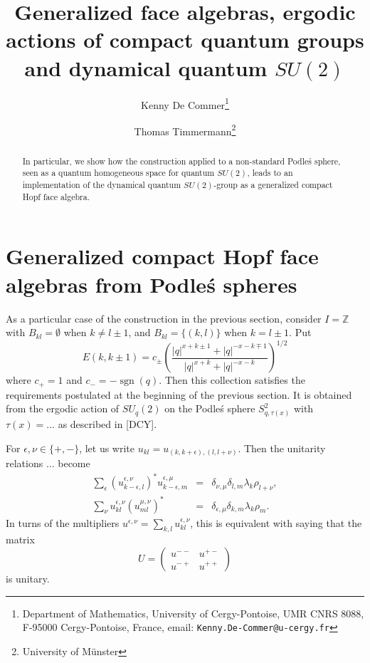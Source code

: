 \documentclass[12pt]{article}
\date{}
\theoremstyle{change}
\DeclareMathOperator{\sgn}{\mathrm{sgn}}
\newcommand{\Z}{\mathbb{Z}}
\theoremstyle{definition}
\numberwithin{equation}{section}
\begin{document}
\title{{\scriptsize Generalized face algebras,} ergodic actions of compact quantum groups {\scriptsize and dynamical quantum $SU(2)$}}

\author{Kenny De Commer\thanks{Department of Mathematics, University of Cergy-Pontoise, UMR CNRS 8088, F-95000 Cergy-Pontoise, France, email: {\tt Kenny.De-Commer@u-cergy.fr}}
\and Thomas Timmermann\thanks{University of M\"{u}nster}}

\maketitle


\begin{abstract}
 In particular, we show how the construction applied to a non-standard Podle\'{s} sphere, seen as a quantum homogeneous space for quantum $SU(2)$, leads to an implementation of the dynamical quantum $SU(2)$-group as a generalized compact Hopf face algebra.
\end{abstract}




\section*{Generalized compact Hopf face algebras from Podle\'{s} spheres}

As a particular case of the construction in the previous section, consider $I = \Z$ with $B_{kl} =\emptyset$ when $k\neq l\pm 1$, and $B_{kl} = \{(k,l)\}$ when $k = l\pm 1$. Put \[E(k,k\pm1) =c_{\pm}\left(\frac{|q|^{x+k\pm1}+|q|^{-x-k\mp1}}{|q|^{x+k}+|q|^{-x-k}}\right)^{1/2}\] where $c_{+}=1$ and $c_-=-\sgn(q)$. Then this collection satisfies the requirements postulated at the beginning of the previous section. It is obtained from the ergodic action of $SU_q(2)$ on the Podle\'{s} sphere $S_{q,\tau(x)}^2$ with $\tau(x) = ...$ as described in [DCY].

For $\epsilon,\nu\in \{+,-\}$, let us write $u_{kl} = u_{(k,k+\epsilon),(l,l+\nu)}$. Then the unitarity relations ... become \begin{eqnarray*} \sum_{\epsilon} (u_{k-\epsilon,l}^{\epsilon,\nu})^*u_{k-\epsilon,m}^{\epsilon,\mu} &=& \delta_{\nu,\mu}\delta_{l,m} \lambda_k\rho_{l+\nu},\\ \sum_{\nu} u_{kl}^{\epsilon,\nu}(u_{ml}^{\mu,\nu})^* &=& \delta_{\epsilon,\mu}\delta_{k,m}\lambda_k\rho_m.\end{eqnarray*} In turns of the multipliers $u^{\epsilon,\nu} = \sum_{k,l} u^{\epsilon,\nu}_{kl}$, this is equivalent with saying that the matrix \[U = \begin{pmatrix} u^{--}& u^{+-} \\ u^{-+}&u^{++}\end{pmatrix}\] is unitary.
\end{document}

